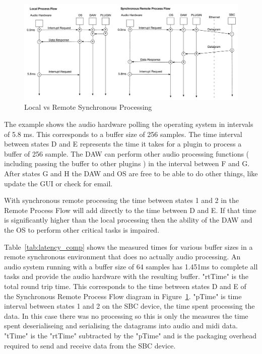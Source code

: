 \begin{figure}[H]
    \centering
    \includegraphics[width=\textwidth]{assets/conclusion/process_flow_compared.pdf}
    \caption{Local vs Remote Synchronous Processing}
    \label{fig:local_vs_remote}
\end{figure}

The example shows the audio hardware polling the operating system in intervals of 5.8 ms. This corresponds to a buffer size of 256 samples. The time interval between states D and E represents the time it takes for a plugin to process a buffer of 256 sample. The DAW can perform other audio processing functions ( including passing the buffer to other plugins ) in the interval between F and G. After states G and H the DAW and OS are free to be able to do other things, like update the GUI or check for email.

With synchronous remote processing the time between states 1 and 2 in the Remote Process Flow will add directly to the time between D and E. If that time is significantly higher than the local processing then the ability of the DAW and the OS to perform other critical tasks is impaired.



Table~\ref{tab:latency_comp} shows the measured times for various buffer sizes in a remote synchronous environment that does no actually audio processing. An audio system running with a buffer size of 64 samples has 1.451ms to complete all tasks and provide the audio hardware with the resulting buffer. "rtTime" is the total round trip time. This corresponds to the time between states D and E of the Synchronous Remote Process Flow diagram in Figure~\ref{fig:local_vs_remote}. "pTime" is time interval between states 1 and 2 on the SBC device, the time spent processing the data. In this case there was no processing so this is only the measures the time spent deserialiseing and serialising the datagrams into audio and midi data. "tTime" is the "rtTime" subtracted by the "pTime" and is the packaging overhead required to send and receive data from the SBC device.

